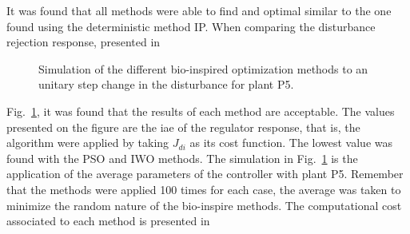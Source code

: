It was found that all methods were able to find and optimal similar to the one found using the deterministic method IP. When comparing the disturbance rejection response, presented in %
%
\begin{figure}[tb]%
	\centering
	\caption{Simulation of the different bio-inspired optimization methods to an unitary step change in the disturbance for plant P5.}%
	\label{fig:Disturbance}%
\end{figure}
%
Fig.~\ref{fig:Disturbance}, it was found that the results of each method are acceptable. The values presented on the figure are the \gls{iae} of the regulator response, that is, the algorithm were applied by taking $J_{di}$ as its cost function. The lowest value was found with the PSO and IWO methods. The simulation in Fig.~\ref{fig:Disturbance} is the application of the average parameters of the controller with plant P5. Remember that the methods were applied 100 times for each case, the average was taken to minimize the random nature of the bio-inspire methods. The computational cost associated to each method is presented in %
%
